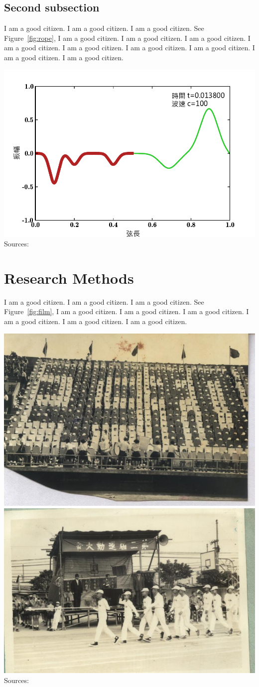 \documentclass[12pt]{article}
\begin{document}
\subsection{Second subsection}

I am a good citizen. I am a good citizen. I am a good citizen.
See Figure~\ref{fig:rope},
I am a good citizen. I am a good citizen. I am a good citizen.
I am a good citizen. I am a good citizen. I am a good citizen.
I am a good citizen. I am a good citizen. I am a good citizen.


 
{\includegraphics[width=.7\linewidth]{wave_inhomo_0276}}
{Sources: }


\section{Research Methods}
I am a good citizen. I am a good citizen. I am a good citizen.
See Figure~\ref{fig:film},
I am a good citizen. I am a good citizen. I am a good citizen.
I am a good citizen. I am a good citizen. I am a good citizen.

{
\includegraphics[width=.45\linewidth]{50603.jpg}
\includegraphics[width=.45\linewidth]{50608.jpg}
}
{Sources: }
\end{document}
